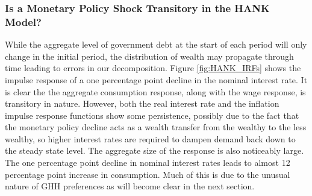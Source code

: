 \documentclass[titlepage]{\econtex}\newcommand{\texname}{ConsumptionHeterogeneity}
\begin{document}
\subsubsection{Is a Monetary Policy Shock Transitory in the HANK Model?}
While the aggregate level of government debt at the start of each period will only change in the initial period, the distribution of wealth may propagate through time leading to errors in our decomposition. Figure \ref{fig:HANK_IRFs} shows the impulse response of a one percentage point decline in the nominal interest rate. It is clear the the aggregate consumption response, along with the wage response, is transitory in nature. However, both the real interest rate and the inflation impulse response functions show some persistence, possibly due to the fact that the monetary policy decline acts as a wealth transfer from the wealthy to the less wealthy, so higher interest rates are required to dampen demand back down to the steady state level. The aggregate size of the response is also noticeably large. The one percentage point decline in nominal interest rates leads to almost 12 percentage point increase in consumption. Much of this is due to the unusual nature of GHH preferences as will become clear in the next section.
\end{document}
